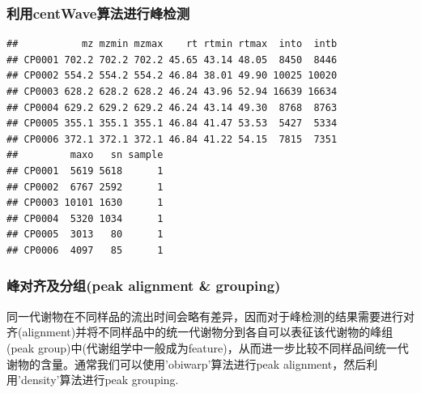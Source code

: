 \documentclass[]{ctexbook}
\newenvironment{Shaded}{\begin{snugshade}}{\end{snugshade}}
\newcommand{\CommentTok}[1]{\textcolor[rgb]{0.56,0.35,0.01}{\textit{#1}}}
\newcommand{\DataTypeTok}[1]{\textcolor[rgb]{0.13,0.29,0.53}{#1}}
\newcommand{\DecValTok}[1]{\textcolor[rgb]{0.00,0.00,0.81}{#1}}
\newcommand{\KeywordTok}[1]{\textcolor[rgb]{0.13,0.29,0.53}{\textbf{#1}}}
\newcommand{\NormalTok}[1]{#1}
\newcommand{\OperatorTok}[1]{\textcolor[rgb]{0.81,0.36,0.00}{\textbf{#1}}}
\newcommand{\StringTok}[1]{\textcolor[rgb]{0.31,0.60,0.02}{#1}}
\begin{document}
\hypertarget{centwave}{%
\subsubsection{利用centWave算法进行峰检测}\label{centwave}}

\begin{Shaded}
\end{Shaded}

\begin{verbatim}
##           mz mzmin mzmax    rt rtmin rtmax  into  intb
## CP0001 702.2 702.2 702.2 45.65 43.14 48.05  8450  8446
## CP0002 554.2 554.2 554.2 46.84 38.01 49.90 10025 10020
## CP0003 628.2 628.2 628.2 46.24 43.96 52.94 16639 16634
## CP0004 629.2 629.2 629.2 46.24 43.14 49.30  8768  8763
## CP0005 355.1 355.1 355.1 46.84 41.47 53.53  5427  5334
## CP0006 372.1 372.1 372.1 46.84 41.22 54.15  7815  7351
##         maxo   sn sample
## CP0001  5619 5618      1
## CP0002  6767 2592      1
## CP0003 10101 1630      1
## CP0004  5320 1034      1
## CP0005  3013   80      1
## CP0006  4097   85      1
\end{verbatim}

\hypertarget{peak-alignment-grouping}{%
\subsubsection{峰对齐及分组(peak alignment \& grouping)}\label{peak-alignment-grouping}}

同一代谢物在不同样品的流出时间会略有差异，因而对于峰检测的结果需要进行对齐(alignment)并将不同样品中的统一代谢物分到各自可以表征该代谢物的峰组(peak group)中(代谢组学中一般成为feature)，从而进一步比较不同样品间统一代谢物的含量。通常我们可以使用'obiwarp'算法进行peak alignment，然后利用'density'算法进行peak grouping.
\end{document}
